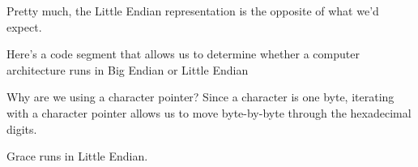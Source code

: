 Pretty much, the Little Endian representation is the opposite of what we'd expect. 


Here's a code segment that allows us to determine whether a computer architecture runs in Big Endian or Little Endian



\lstset{
caption=Determining Endianness}
\begin{center}
\label{Determining Endianness}
\end{center}

Why are we using a character pointer? Since a character is one byte, iterating with a character pointer allows us to move byte-by-byte through the hexadecimal digits.


Grace runs in Little Endian.